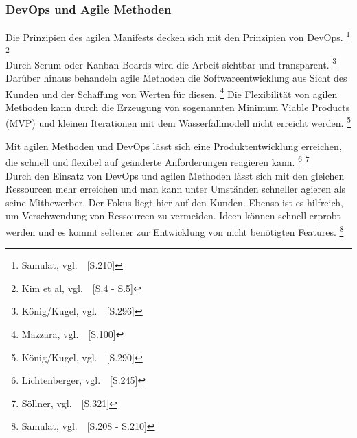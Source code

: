 \subsubsection{DevOps und Agile Methoden}\label{devops_und_agile}

Die Prinzipien des agilen Manifests decken sich mit den Prinzipien von DevOps.
\footnote{Samulat, vgl.~\cite{Samulat2017}~[S.210]}
\footnote{Kim et al, vgl.~\cite{Kim2018}~[S.4 - S.5]} \\

Durch Scrum oder Kanban Boards wird die Arbeit sichtbar und transparent. \footnote{König/Kugel, vgl.~\cite{Konig2019}~[S.296]}
Darüber hinaus behandeln agile Methoden die Softwareentwicklung aus Sicht des Kunden und der Schaffung von Werten für diesen. \footnote{Mazzara, vgl.~\cite{Mazzara2019}~[S.100]}
Die Flexibilität von agilen Methoden kann durch die Erzeugung von sogenannten Minimum Viable Products (MVP) und kleinen Iterationen mit dem Wasserfallmodell nicht erreicht werden. \footnote{König/Kugel, vgl.~\cite{Konig2019}~[S.290]}

Mit agilen Methoden und DevOps lässt sich eine Produktentwicklung erreichen, die schnell und flexibel auf geänderte Anforderungen reagieren kann.
\footnote{Lichtenberger, vgl.~\cite{Lichtenberger2017}~[S.245]}
\footnote{Söllner, vgl.~\cite{Sollner2019}~[S.321]} \\

Durch den Einsatz von DevOps und agilen Methoden lässt sich mit den gleichen Ressourcen mehr erreichen und man kann unter Umständen schneller agieren als seine Mitbewerber.
Der Fokus liegt hier auf den Kunden.
Ebenso ist es hilfreich, um Verschwendung von Ressourcen zu vermeiden.
Ideen können schnell erprobt werden und es kommt seltener zur Entwicklung von nicht benötigten Features.
\footnote{Samulat, vgl.~\cite{Samulat2017}~[S.208 - S.210]}

